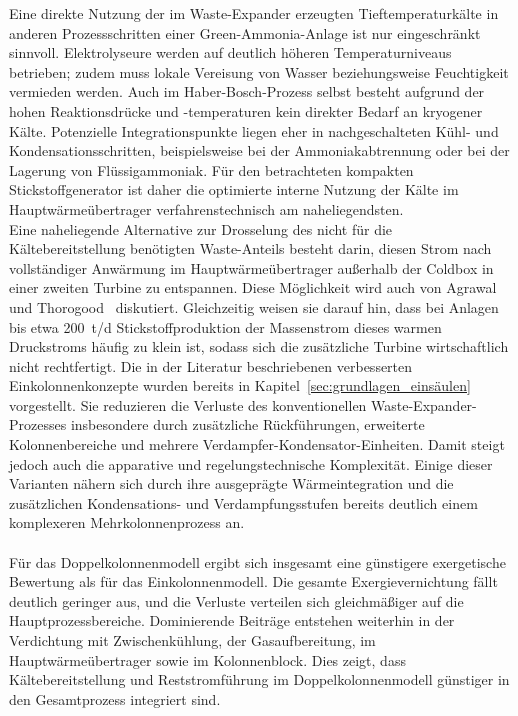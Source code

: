 Eine direkte Nutzung der im Waste-Expander erzeugten Tieftemperaturkälte in anderen Prozessschritten einer Green-Ammonia-Anlage ist nur eingeschränkt sinnvoll. Elektrolyseure werden auf deutlich höheren Temperaturniveaus betrieben; zudem muss lokale Vereisung von Wasser beziehungsweise Feuchtigkeit vermieden werden. Auch im Haber-Bosch-Prozess selbst besteht aufgrund der hohen Reaktionsdrücke und -temperaturen kein direkter Bedarf an kryogener Kälte. Potenzielle Integrationspunkte liegen eher in nachgeschalteten Kühl- und Kondensationsschritten, beispielsweise bei der Ammoniakabtrennung oder bei der Lagerung von Flüssigammoniak. Für den betrachteten kompakten Stickstoffgenerator ist daher die optimierte interne Nutzung der Kälte im Hauptwärmeübertrager verfahrenstechnisch am naheliegendsten.\\
Eine naheliegende Alternative zur Drosselung des nicht für die Kältebereitstellung benötigten Waste-Anteils besteht darin, diesen Strom nach vollständiger Anwärmung im Hauptwärmeübertrager außerhalb der Coldbox in einer zweiten Turbine zu entspannen. Diese Möglichkeit wird auch von Agrawal und Thorogood~\cite{agrawalProductionMediumPressure1991} diskutiert. Gleichzeitig weisen sie darauf hin, dass bei Anlagen bis etwa \SI{200}{t/d} Stickstoffproduktion der Massenstrom dieses warmen Druckstroms häufig zu klein ist, sodass sich die zusätzliche Turbine wirtschaftlich nicht rechtfertigt. Die in der Literatur beschriebenen verbesserten Einkolonnenkonzepte wurden bereits in Kapitel~\ref{sec:grundlagen_einsäulen} vorgestellt. Sie reduzieren die Verluste des konventionellen Waste-Expander-Prozesses insbesondere durch zusätzliche Rückführungen, erweiterte Kolonnenbereiche und mehrere Verdampfer-Kondensator-Einheiten. Damit steigt jedoch auch die apparative und regelungstechnische Komplexität. Einige dieser Varianten nähern sich durch ihre ausgeprägte Wärmeintegration und die zusätzlichen Kondensations- und Verdampfungsstufen bereits deutlich einem komplexeren Mehrkolonnenprozess an.\\
\\
Für das Doppelkolonnenmodell ergibt sich insgesamt eine günstigere exergetische Bewertung als für das Einkolonnenmodell. Die gesamte Exergievernichtung fällt deutlich geringer aus, und die Verluste verteilen sich gleichmäßiger auf die Hauptprozessbereiche. Dominierende Beiträge entstehen weiterhin in der Verdichtung mit Zwischenkühlung, der Gasaufbereitung, im Hauptwärmeübertrager sowie im Kolonnenblock. Dies zeigt, dass Kältebereitstellung und Reststromführung im Doppelkolonnenmodell günstiger in den Gesamtprozess integriert sind.\\
